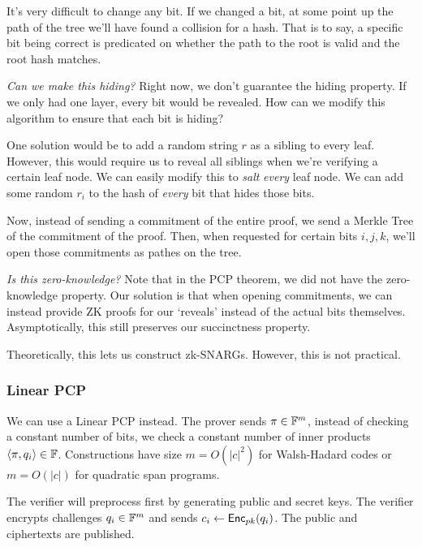 It's very difficult to change any bit. If we changed a bit, at some point up the path of the tree we'll have found a collision for a hash. That is to say, a specific bit being correct is predicated on whether the path to the root is valid and the root hash matches.

\emph{Can we make this hiding?} Right now, we don't guarantee the hiding property. If we only had one layer, every bit would be revealed. How can we modify this algorithm to ensure that each bit is hiding?

One solution would be to add a random string $r$ as a sibling to every leaf. However, this would require us to reveal all siblings when we're verifying a certain leaf node. We can easily modify this to \emph{salt} \emph{every} leaf node. We can add some random $r_i$ to the hash of \emph{every} bit that hides those bits.


Now, instead of sending a commitment of the entire proof, we send a Merkle Tree of the commitment of the proof. Then, when requested for certain bits $i, j, k$, we'll open those commitments as pathes on the tree.

\emph{Is this zero-knowledge?} Note that in the PCP theorem, we did not have the zero-knowledge property. Our solution is that when opening commitments, we can instead provide ZK proofs for our `reveals' instead of the actual bits themselves. Asymptotically, this still preserves our succinctness property.

Theoretically, this lets us construct zk-SNARGs. However, this is not practical.

\subsubsection{Linear PCP}


We can use a Linear PCP instead. The prover sends $\pi\in\mathbb F^m$, instead of checking a constant number of bits, we check a constant number of inner products $\langle \pi, q_i\rangle\in\mathbb F$. Constructions have size $m = O(|c|^2)$ for Walsh-Hadard codes or $m = O(|c|)$ for quadratic span programs.

The verifier will preprocess first by generating public and secret keys. The verifier encrypts challenges $q_i\in\mathbb F^m$ and sends $c_i\leftarrow \operatorname{\mathsf{Enc}}_{pk}(q_i)$. The public and ciphertexts are published.


